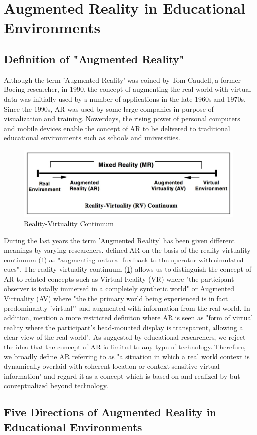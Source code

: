 \section{Augmented Reality in Educational Environments}

\subsection{Definition of "Augmented Reality"}
Although the term 'Augmented Reality' was coined by Tom Caudell, a former Boeing researcher, in 1990, the concept of augmenting the real world with virtual data was initially used by a number of applications in the late 1960s and 1970s. Since the 1990s, AR was used by some large companies in purpose of visualization and training. Nowerdays, the rising power of personal computers and mobile devices enable the concept of AR to be delivered to traditional educational environments such as schools and universities. \autocite [cf.][21]{Johnson.2010} 
\begin{figure}[ptbh]
    \centering
    \includegraphics[width=\linewidth]{figures/rvc.png}
    \caption[Reality-Virtuality Continuum]{Reality-Virtuality Continuum}
    \label{fig:RealityVirtualityContinuum}
\end{figure}

During the last years the term 'Augmented Reality' has been given different meanings by varying researchers. \autocite [cf.][42]{Wu.2013} \cite{Milgram.1994b} defined AR on the basis of the reality-virtuality continuum (\ref{fig:RealityVirtualityContinuum}) as "augmenting natural feedback to the operator with simulated cues". \autocite[283]{Milgram.1994b} The reality-virtuality continuum (\ref{fig:RealityVirtualityContinuum}) allows us to distinguish the concept of AR to related concepts such as Virtual Reality (VR) where "the participant observer is totally immersed in a completely synthetic world" \autocite[283]{Milgram.1994b} or Augmented Virtuality (AV) where "the the primary world being experienced is in fact [...] predominantly 'virtual'"\autocite[4]{Milgram.1994} and augmented with information from the real world. In addition, \cite{Milgram.1994b} mention a more restricted definiton where AR is seen as "form of virtual reality where the participant's head-mounted display is transparent, allowing a clear view of the real world". \autocite[283]{Milgram.1994b} As suggested by educational researchers,\autocite[cf.][42]{Wu.2013} we reject the idea that the concept of AR is limited to any type of technology. Therefore, we broadly define AR referring to \cite{Klopfer.2008} as "a situation in which a real world context is dynamically overlaid with coherent location or context sensitive virtual information"\autocite[205]{Klopfer.2008} and regard it as a concept which is based on and realized by but conzeptualized beyond technology.

\subsection{Five Directions of Augmented Reality in Educational Environments}